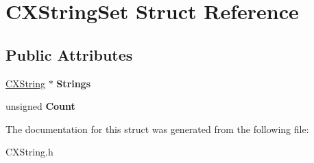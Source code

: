 \hypertarget{structCXStringSet}{}\section{C\+X\+String\+Set Struct Reference}
\label{structCXStringSet}
\subsection*{Public Attributes}
\begin{DoxyCompactItemize}
\item 
\mbox{\label{structCXStringSet_a5f79318710bec53e295f32040e302127}} 
\mbox{\hyperlink{structCXString}{C\+X\+String}} $\ast$ {\bfseries Strings}
\item 
\mbox{\label{structCXStringSet_acd708a7c03946993840847776ec31e50}} 
unsigned {\bfseries Count}
\end{DoxyCompactItemize}


The documentation for this struct was generated from the following file\+:\begin{DoxyCompactItemize}
\item 
C\+X\+String.\+h\end{DoxyCompactItemize}
